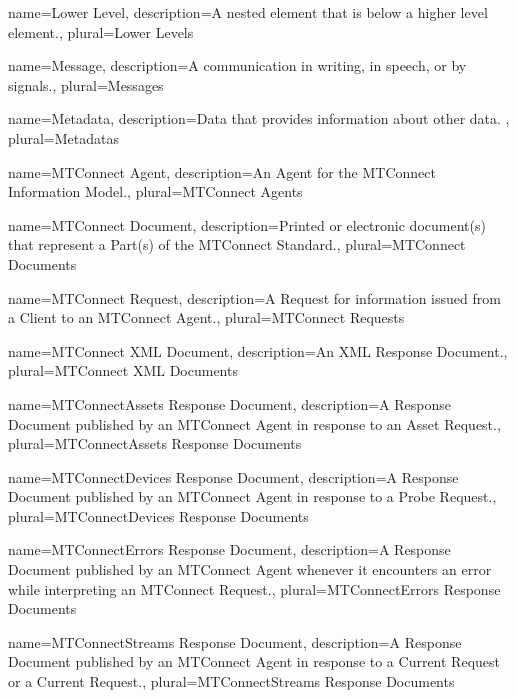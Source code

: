 {
    name={Lower Level},
	description={A nested element that is below a higher level element.},
	plural={Lower Levels}
}

{
    name={Message},
	description={A communication in writing, in speech, or by signals.},
	plural={Messages}
}

{
    name={Metadata},
	description={Data that provides information about other data.
},
	plural={Metadatas}
}

{
    name={MTConnect Agent},
	description={An \gls{Agent} for the \gls{MTConnect Information Model}.},
	plural={MTConnect Agents}
}

{
    name={MTConnect Document},
	description={Printed or electronic document(s) that represent a Part(s) of the MTConnect Standard.},
	plural={MTConnect Documents}
}

{
    name={MTConnect Request},
	description={A \gls{Request} for information issued from a \gls{Client} to an \gls{MTConnect Agent}.},
	plural={MTConnect Requests}
}

{
    name={MTConnect XML Document},
	description={An XML \gls{Response Document}.},
	plural={MTConnect XML Documents}
}

{
    name={MTConnectAssets Response Document},
	description={A \gls{Response Document} published by an \gls{MTConnect Agent} in response to an \gls{Asset Request}.},
	plural={MTConnectAssets Response Documents}
}

{
    name={MTConnectDevices Response Document},
	description={A \gls{Response Document} published by an \gls{MTConnect Agent} in response to a \gls{Probe Request}.},
	plural={MTConnectDevices Response Documents}
}

{
    name={MTConnectErrors Response Document},
	description={A \gls{Response Document} published by an \gls{MTConnect Agent} whenever it encounters an error while interpreting an \gls{MTConnect Request}.},
	plural={MTConnectErrors Response Documents}
}

{
    name={MTConnectStreams Response Document},
	description={A \gls{Response Document} published by an \gls{MTConnect Agent} in response to a \gls{Current Request} or a \gls{Current Request}.},
	plural={MTConnectStreams Response Documents}
}

